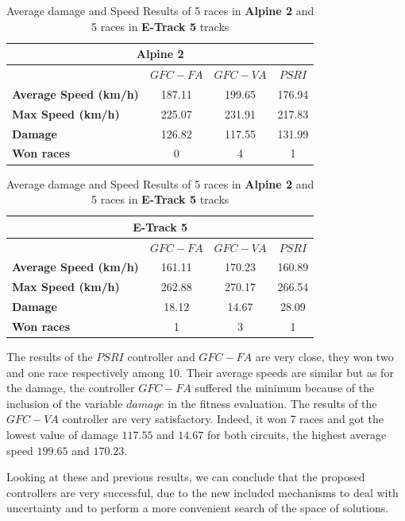 \documentclass[conference]{IEEEtran}
\begin{document}
\begin{table}[!ht]
  \centering
  {\scriptsize
    \caption{Average damage and Speed Results of 5 races in
      \textbf{Alpine 2} and 5 races in \textbf{E-Track 5} tracks}
    \label{tab:damagespeed}
    \begin{tabular}{|p{1.65cm}|c|c|c|}
      \hline 
      \multicolumn{4}{|c|}{\textbf{Alpine 2}}  \\	
      \hline  
   & \textbf{$GFC-FA$}&\textbf{$GFC-VA$} & \textbf{$PSRI$}\\					
      \hline \textbf{Average Speed (km/h)}& 187.11&199.65&176.94\\
      \hline \textbf{Max Speed (km/h)}& 225.07&231.91&217.83\\	
      \hline \textbf{Damage}& 126.82& 117.55&131.99 \\	
      \hline \textbf{Won races}&0&4&1\\	
      
      \hline 
    \end{tabular}
    \begin{tabular}{|p{1.65cm}|c|c|c|}
      \hline 
      \multicolumn{4}{|c|}{\textbf{E-Track 5}}  \\
      \hline 
& \textbf{$GFC-FA$}&\textbf{$GFC-VA$} & \textbf{$PSRI$}\\				
      \hline \textbf{Average Speed (km/h)}& 161.11&170.23&160.89\\
      \hline \textbf{Max Speed  (km/h)}&262.88&270.17&266.54\\	
      \hline \textbf{Damage}&18.12& 14.67&28.09\\	 
      \hline \textbf{Won races}&1&3&1\\	
      \hline 
    \end{tabular}
	}
\end{table} 

The results of the $PSRI$ controller and $GFC-FA$ are very close, they won two and one race respectively among 10. Their average speeds are similar but as for the damage, the controller $GFC-FA$ suffered the minimum because of the inclusion of the variable $damage$ in the fitness evaluation.
The results of the $GFC-VA$ controller are very satisfactory. Indeed, it won 7 races and got the lowest value of damage $117.55$ and $14.67$ for both circuits, the highest average speed $199.65$ and $170.23$.

Looking at these and previous results, we can conclude that the proposed controllers are very successful, due to the new included mechanisms to deal with uncertainty and to perform a more convenient search of the space of solutions.
\end{document}
